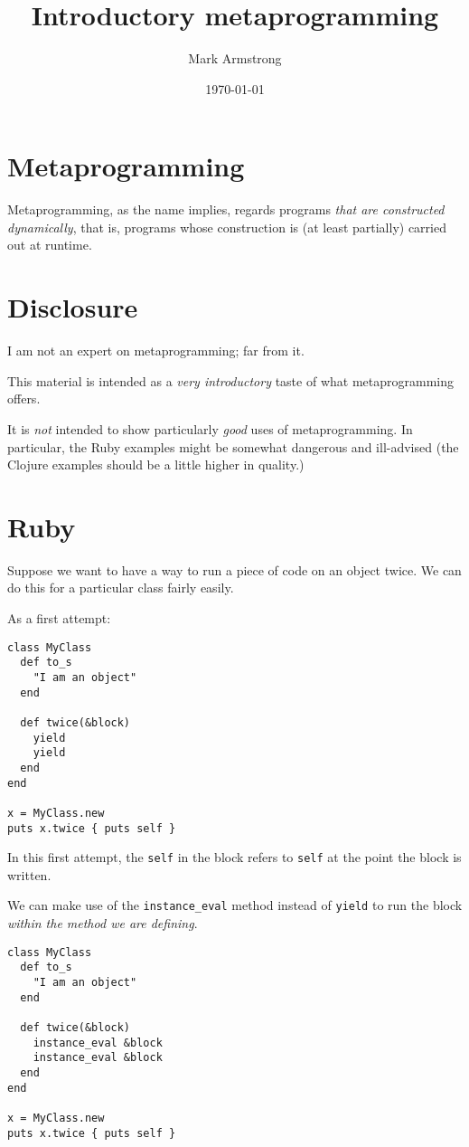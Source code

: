 \documentclass[11pt]{article}
\author{Mark Armstrong}
\date{\today}
\title{Introductory metaprogramming}
\begin{document}
\maketitle
\tableofcontents


\section{Metaprogramming}
\label{sec:org2220db9}
Metaprogramming, as the name implies,
regards programs \emph{that are constructed dynamically},
that is, programs whose construction is (at least partially)
carried out at runtime.

\section{Disclosure}
\label{sec:org1283a49}
I am not an expert on metaprogramming; far from it.

This material is intended as a \emph{very introductory} taste of what
metaprogramming offers.

It is \emph{not} intended to show particularly \emph{good} uses of metaprogramming.
In particular, the Ruby examples might be somewhat dangerous and
ill-advised (the Clojure examples should be a little higher in quality.)

\section{Ruby}
\label{sec:org559f97b}
Suppose we want to have a way to run a piece of code on an object
twice. We can do this for a particular class fairly easily.

As a first attempt:
\begin{verbatim}
class MyClass
  def to_s
    "I am an object"
  end

  def twice(&block)
    yield
    yield
  end
end

x = MyClass.new
puts x.twice { puts self }
\end{verbatim}

In this first attempt, the \texttt{self} in the block refers to \texttt{self} at the
point the block is written.

We can make use of the \texttt{instance\_eval} method instead of \texttt{yield} to
run the block \emph{within the method we are defining}.
\begin{verbatim}
class MyClass
  def to_s
    "I am an object"
  end

  def twice(&block)
    instance_eval &block
    instance_eval &block
  end
end

x = MyClass.new
puts x.twice { puts self }
\end{verbatim}
\end{document}
